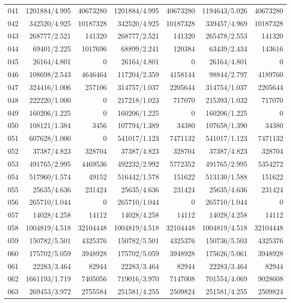 \begin{longtable}{crrrrrr}
041 & 1201884/4.995 & 40673280 & 1201884/4.995 & 40673280 & 1194643/5.026 & 40673280 \\
042 & 342520/4.925 & 10187328 & 342520/4.925 & 10187328 & 339457/4.969 & 10187328 \\
043 & 268777/2.521 & 141320 & 268777/2.521 & 141320 & 265478/2.553 & 141320 \\
044 & 69401/2.225 & 1017696 & 68899/2.241 & 120384 & 63439/2.434 & 143616 \\
045 & 26164/4.801 & 0 & 26164/4.801 & 0 & 26164/4.801 & 0 \\
046 & 108698/2.543 & 4646464 & 117204/2.359 & 4158144 & 98844/2.797 & 4189760 \\
047 & 324416/1.006 & 257106 & 314757/1.037 & 2205644 & 314754/1.037 & 2205644 \\
048 & 222220/1.000 & 0 & 217218/1.023 & 717070 & 215393/1.032 & 717070 \\
049 & 160206/1.225 & 0 & 160206/1.225 & 0 & 160206/1.225 & 0 \\
050 & 108121/1.384 & 3456 & 107794/1.389 & 34380 & 107658/1.390 & 34380 \\
051 & 607628/1.000 & 0 & 541017/1.123 & 7471132 & 541017/1.123 & 7471132 \\
052 & 37387/4.823 & 328704 & 37387/4.823 & 328704 & 37387/4.823 & 328704 \\
053 & 491765/2.995 & 4469536 & 492232/2.992 & 5772352 & 491765/2.995 & 5354272 \\
054 & 517960/1.574 & 49152 & 516442/1.578 & 151622 & 513130/1.588 & 151622 \\
055 & 25635/4.636 & 231424 & 25635/4.636 & 231424 & 25635/4.636 & 231424 \\
056 & 265710/1.044 & 0 & 265710/1.044 & 0 & 265710/1.044 & 0 \\
057 & 14028/4.258 & 14112 & 14028/4.258 & 14112 & 14028/4.258 & 14112 \\
058 & 1004819/4.518 & 32104448 & 1004819/4.518 & 32104448 & 1004819/4.518 & 32104448 \\
059 & 150782/5.501 & 4325376 & 150782/5.501 & 4325376 & 150736/5.503 & 4325376 \\
060 & 175702/5.059 & 3948928 & 175702/5.059 & 3948928 & 175626/5.061 & 3948928 \\
061 & 22283/3.464 & 82944 & 22283/3.464 & 82944 & 22283/3.464 & 82944 \\
062 & 1661193/1.719 & 7405056 & 719016/3.970 & 7147008 & 701554/4.069 & 9028608 \\
063 & 269453/3.972 & 2755584 & 251581/4.255 & 2509824 & 251581/4.255 & 2509824 \\

\end{longtable}
